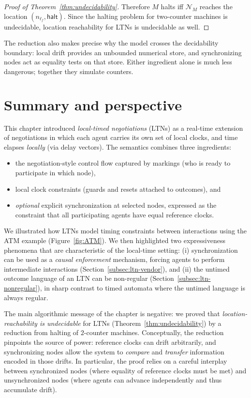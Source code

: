 \begin{proof}[Proof of Theorem~\ref{thm:undecidability}]
Therefore $M$ halts iff $\mathcal N_M$ reaches the location
$(n_{\ell_f},\mathsf{halt})$.  Since the halting problem for two-counter
machines is undecidable, location reachability for LTNs is undecidable as well.
\end{proof}


The reduction also makes precise why the model crosses the decidability
boundary: local drift provides an unbounded numerical store, and synchronizing
nodes act as equality tests on that store.  Either ingredient alone is much less
dangerous; together they simulate counters.


\section{Summary and perspective}
\label{sec:summary-ch3}

This chapter introduced \emph{local-timed negotiations} (LTNs) as a real-time
extension of negotiations in which each agent carries its own set of local clocks,
and time elapses \emph{locally} (via delay vectors).  The semantics combines three
ingredients:

\begin{itemize}
  \item the negotiation-style control flow captured by markings (who is ready to
        participate in which node),
  \item local clock constraints (guards and resets attached to outcomes), and
  \item \emph{optional} explicit synchronization at selected nodes, expressed as the
        constraint that all participating agents have equal reference clocks.
\end{itemize}

We illustrated how LTNs model timing constraints between interactions using the
ATM example (Figure~\ref{fig:ATM}).  We then highlighted two expressiveness
phenomena that are characteristic of the local-time setting:
(i) synchronization can be used as a \emph{causal enforcement} mechanism, forcing
agents to perform intermediate interactions (Section~\ref{subsec:ltn-vendor}),
and (ii) the untimed outcome language of an LTN can be non-regular
(Section~\ref{subsec:ltn-nonregular}), in sharp contrast to timed automata where
the untimed language is always regular.

The main algorithmic message of the chapter is negative: we proved that
\emph{location-reachability is undecidable} for LTNs (Theorem~\ref{thm:undecidability})
by a reduction from halting of $2$-counter machines.  Conceptually, the reduction
pinpoints the source of power: reference clocks can drift arbitrarily, and
synchronizing nodes allow the system to \emph{compare} and \emph{transfer}
information encoded in those drifts.  In particular, the proof relies on a careful
interplay between synchronized nodes (where equality of reference clocks must be
met) and unsynchronized nodes (where agents can advance independently and thus
accumulate drift).

